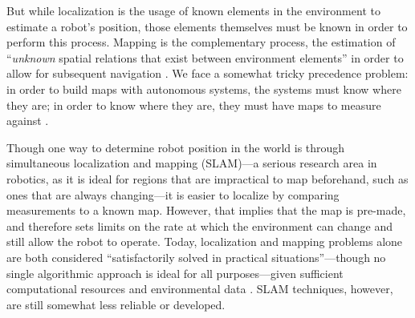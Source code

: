 But while
localization is the usage of known elements in the environment to
estimate a robot's position, those elements themselves must be known
in order to perform this process. Mapping is the complementary
process, the estimation of ``\emph{unknown} spatial relations that
exist between environment elements'' in order to allow for subsequent
navigation \cite[p. 5]{SLAMbook}. We face a somewhat tricky
precedence problem:  in order to build maps with
autonomous systems, the systems must know where they are; in order to know
where they are, they must have maps to measure
against \cite[p. 6]{SLAMbook}.



Though one way to determine robot position in the world is through
simultaneous localization and mapping (SLAM)---a serious research area in
robotics, as it is ideal for regions that are impractical to map
beforehand, such as ones that are always changing---it is easier to localize by comparing
measurements to a known map. However, that implies that the map is
pre-made, and therefore sets limits on the rate at which the
environment can change and still allow the robot to operate. Today, localization and
mapping problems alone are both considered ``satisfactorily solved in practical
situations''---though no single algorithmic approach is ideal for all purposes---given sufficient
computational resources and environmental data \cite[p.
  5-6]{SLAMbook}. SLAM techniques, however,
are still somewhat less reliable or developed.





